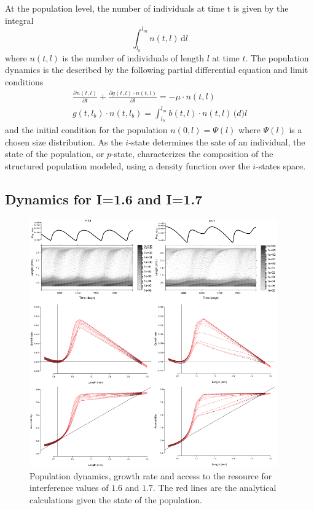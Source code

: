 At the population level, the number of individuals at time t is given by the
integral
\begin{equation}
\label{eq_10}
\int_{l_b}^{l_m}\!n(t,l)\,\mathrm{d}l
\end{equation}
where $n(t,l)$ is the number of individuals of length $l$ at time $t$. The
population dynamics is the described by the following partial differential
equation and limit conditions \autocites{kooijman1984a,de-roos1997a}
\begin{align}
\label{eq_11}
\frac{\partial n(t,l)}{\partial t}+\frac{\partial g(t,l) \cdot n(t,l)}{\partial l}=-\mu \cdot n(t,l) \\
g(t,l_b) \cdot n(t,l_b)= \int_{l_b} ^{l_m} \! b(t,l)\cdot n(t,l)\, \mathrm(d)l
\end{align}
and the initial condition for the population $n(0,l)=\Psi(l)$ where $\Psi(l)$ is
a chosen size distribution. As the $i$-state determines the sate of an
individual, the state of the population, or $p$-state, characterizes the
composition of the structured population modeled, using a density function over
the $i$-states space. 

\newpage
\subsection{Dynamics for I=1.6 and I=1.7}\label{subsec:SupMat3}

\begin{figure}[H] %
\centering
\includegraphics[width=0.95\textwidth]{4_ChapThe1/Fig/FigSM6}
\caption[Sample dynamics for I=1.6 and
I=1.7]{Population dynamics, growth rate and access to the resource for interference values of $1.6$ and $1.7$. The red lines are the analytical calculations given the state of the population.}
\label{Fig4-SM6}
\end{figure}

